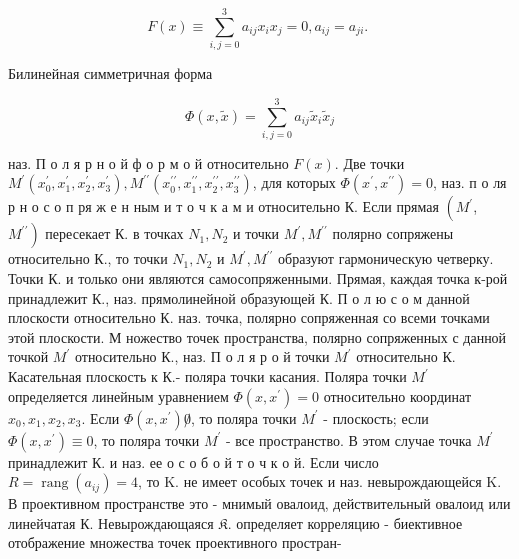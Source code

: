 \documentclass[10pt]{article}
\begin{document}
\[

F(x) \equiv \sum_{i, j=0}^{3} a_{i j} x_{i} x_{j}=0, a_{i j}=a_{j i} \text {. }

\]



Билинейная симметричная форма



\[

\Phi(x, \tilde{x})=\sum_{i, j=0}^{3} a_{i j} \tilde{x}_{i} \tilde{x}_{j}

\]



наз. П о л я р н о й ф о р м о й относительно $F(x)$. Две точки $M^{\prime}\left(x_{0}^{\prime}, x_{1}^{\prime}, x_{2}^{\prime}, x_{3}^{\prime}\right), M^{\prime \prime}\left(x_{0}^{\prime \prime}, x_{1}^{\prime \prime}, x_{2}^{\prime \prime}, x_{3}^{\prime \prime}\right)$, для которых $\Phi\left(x^{\prime}, x^{\prime \prime}\right)=0$, наз. п о ля р н о с о п ря ж е н ным и т о ч к а м и относительно К. Если прямая $\left(M^{\prime}\right.$, $\left.M^{\prime \prime}\right)$ пересекает К. в точках $N_{1}, N_{2}$ и точки $M^{\prime}, M^{\prime \prime}$ полярно сопряжены относительно К., то точки $N_{1}, N_{2}$ и $M^{\prime}, M^{\prime \prime}$ образуют гармоническую четверку. Точки $К$. и только они являются самосопряженными. Прямая, каждая точка к-рой принадлежит К., наз. прямолинейной образующей $К$. П о л ю с о м данной плоскости относительно К. наз. точка, полярно сопряженная со всеми точками этой плоскости. М ножество точек пространства, полярно сопряженных с данной точкой $M^{\prime}$ относительно К., наз. П о л я р о й точки $M^{\prime}$ относительно К. Касательная плоскость к К.- поляра точки касания. Поляра точки $M^{\prime}$ определяется линейным уравнением $\Phi\left(x, x^{\prime}\right)=0$ относительно координат $x_{0}, x_{1}, x_{2}, x_{3}$. Если $\Phi\left(x, x^{\prime}\right) \not 0$, то поляра точки $M^{\prime}$ - плоскость; если $\Phi\left(x, x^{\prime}\right) \equiv 0$, то поляра точки $M^{\prime}$ - все пространство. В этом случае точка $M^{\prime}$ принадлежит $К$. и наз. ее о с о б о й т о ч к о й. Если число $R=\operatorname{rang}\left(a_{i j}\right)=4$, то K. не имеет особых точек и наз. невырождающейся $\mathrm{K}$. В проективном пространстве это - мнимый овалоид, действительный овалоид или линейчатая $К$. Невырождающаяся $\mathfrak{K}$. определяет корреляцию - биективное отображение множества точек проективного простран-
\end{document}
